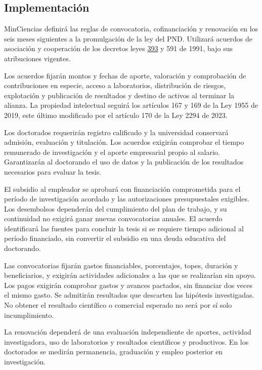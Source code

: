 \subsection{Implementación}

MinCiencias definirá las reglas de convocatoria, cofinanciación y renovación en los seis meses siguientes a la promulgación de la ley del PND. Utilizará acuerdos de asociación y cooperación de los decretos leyes \href{https://www.funcionpublica.gov.co/eva/gestornormativo/norma.php?i=67131}{393} y 591 de 1991, bajo sus atribuciones vigentes.

Los acuerdos fijarán montos y fechas de aporte, valoración y comprobación de contribuciones en especie, acceso a laboratorios, distribución de riesgos, explotación y publicación de resultados y destino de activos al terminar la alianza. La propiedad intelectual seguirá los artículos 167 y 169 de la Ley 1955 de 2019, este último modificado por el artículo 170 de la Ley 2294 de 2023.

Los doctorados requerirán registro calificado y la universidad conservará admisión, evaluación y titulación. Los acuerdos exigirán comprobar el tiempo remunerado de investigación y el aporte empresarial propio al salario. Garantizarán al doctorando el uso de datos y la publicación de los resultados necesarios para evaluar la tesis.

El subsidio al empleador se aprobará con financiación comprometida para el período de investigación acordado y las autorizaciones presupuestales exigibles. Los desembolsos dependerán del cumplimiento del plan de trabajo, y su continuidad no exigirá ganar nuevas convocatorias anuales. El acuerdo identificará las fuentes para concluir la tesis si se requiere tiempo adicional al período financiado, sin convertir el subsidio en una deuda educativa del doctorando.

Las convocatorias fijarán gastos financiables, porcentajes, topes, duración y beneficiarios, y exigirán actividades adicionales a las que se realizarían sin apoyo. Los pagos exigirán comprobar gastos y avances pactados, sin financiar dos veces el mismo gasto. Se admitirán resultados que descarten las hipótesis investigadas. No obtener el resultado científico o comercial esperado no será por sí solo incumplimiento.

La renovación dependerá de una evaluación independiente de aportes, actividad investigadora, uso de laboratorios y resultados científicos y productivos. En los doctorados se medirán permanencia, graduación y empleo posterior en investigación.

